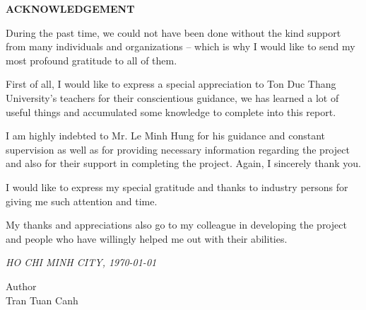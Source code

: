 \newpage	
\vspace{5cm} 

\begin{center}
	{
		\fontsize{16pt}{1}\selectfont
		\textbf{ACKNOWLEDGEMENT}
	}
\end{center} 		
	\noindent
	
	During the past time, we could not have been done without the kind support from many individuals and organizations – which is why I would like to send my most profound gratitude to all of them.
	
	First of all, I would like to express a special appreciation to Ton Duc Thang University’s teachers for their conscientious guidance, we has learned a lot of useful things and accumulated some knowledge to complete into this report. 
	
	I am highly indebted to Mr. Le Minh Hung for his guidance and constant supervision as well as for providing necessary information regarding the project and also for their support in completing the project. Again, I sincerely thank you.
	
	I would like to express my special gratitude and thanks to industry persons for giving me such attention and time.
	
	My thanks and appreciations also go to my colleague in developing the project and people who have willingly helped me out with their abilities.








\vspace{0.15cm}


\begin{flushright}
	{\it HO CHI MINH CITY, \today{} }
	
	Author \hskip 2cm\quad
	~\\[1.5cm] 
	Tran Tuan Canh\hskip 1.5cm\quad
	
	
	
\end{flushright}
